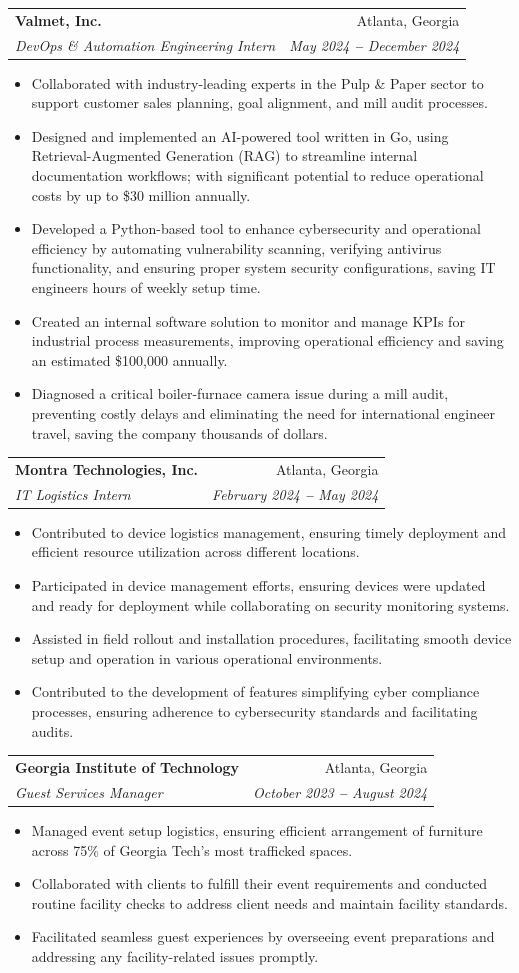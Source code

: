 \documentclass[letterpaper,11pt]{article}
\makeatletter
\newcommand{\resumeItem}[1]{
  \item\small{
    {#1 \vspace{-2pt}}
  }
}
\newcommand{\resumeSubheading}[4]{
  \vspace{-2pt}\item
    \begin{tabular*}{\textwidth}[t]{l@{\extracolsep{\fill}}r}
      \textbf{#1} & #2 \\
      \textit{\small#3} & \textit{\small #4} \\
    \end{tabular*}\vspace{-7pt}
}
\newcommand{\resumeItemListStart}{\begin{itemize}[leftmargin=0.12in]}
\newcommand{\resumeItemListEnd}{\end{itemize}\vspace{-5pt}}
\makeatother
\begin{document}
\resumeSubheading
    {Valmet, Inc.}{Atlanta, Georgia}
    {DevOps \& Automation Engineering Intern}{May 2024 \textbf{--} December 2024}
    \resumeItemListStart
    \resumeItem{Collaborated with industry-leading experts in the Pulp \& Paper sector to support customer sales planning, goal alignment, and mill audit processes.}
    \resumeItem{Designed and implemented an AI-powered tool written in Go, using Retrieval-Augmented Generation (RAG) to streamline internal documentation workflows; with significant potential to reduce operational costs by up to \$30 million annually.}
    \resumeItem{Developed a Python-based tool to enhance cybersecurity and operational efficiency by automating vulnerability scanning, verifying antivirus functionality, and ensuring proper system security configurations, saving IT engineers hours of weekly setup time.}
    \resumeItem{Created an internal software solution to monitor and manage KPIs for industrial process measurements, improving operational efficiency and saving an estimated \$100,000 annually.}
    \resumeItem{Diagnosed a critical boiler-furnace camera issue during a mill audit, preventing costly delays and eliminating the need for international engineer travel, saving the company thousands of dollars.}
    \resumeItemListEnd
    
    \resumeSubheading
      {Montra Technologies, Inc.}{Atlanta, Georgia}
      {IT Logistics Intern}{February 2024 \textbf{--} May 2024}
        \resumeItemListStart
        \resumeItem{Contributed to device logistics management, ensuring timely deployment and efficient resource utilization across different locations.}
        \resumeItem{Participated in device management efforts, ensuring devices were updated and ready for deployment while collaborating on security monitoring systems.}
        \resumeItem{Assisted in field rollout and installation procedures, facilitating smooth device setup and operation in various operational environments.}
        \resumeItem{Contributed to the development of features simplifying cyber compliance processes, ensuring adherence to cybersecurity standards and facilitating audits.}
        \resumeItemListEnd

  \resumeSubheading
      {Georgia Institute of Technology}{Atlanta, Georgia}
      {Guest Services Manager}{October 2023 \textbf{--} August 2024}
        \resumeItemListStart
            \resumeItem{Managed event setup logistics, ensuring efficient arrangement of furniture across 75\% of Georgia Tech's most trafficked spaces.}
            \resumeItem{Collaborated with clients to fulfill their event requirements and conducted routine facility checks to address client needs and maintain facility standards.}
            \resumeItem{Facilitated seamless guest experiences by overseeing event preparations and addressing any facility-related issues promptly.}
        \resumeItemListEnd
\end{document}
